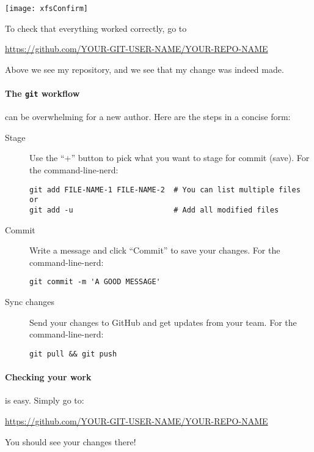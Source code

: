 \documentclass{ximera}
\begin{document}
\newpage

\begin{image}
    \texttt{[image: xfsConfirm]}
\end{image}
To check that everything worked correctly, go to
\begin{center}
    \url{https://github.com/YOUR-GIT-USER-NAME/YOUR-REPO-NAME}
\end{center}
Above we see my repository, and we see that my change was indeed made.


\paragraph{The \texttt{git} workflow} can be overwhelming for a new author. Here are the steps in a concise form:
\begin{description}
    \item[Stage] Use the ``+'' button to pick what you want to
          stage for commit (save). For the command-line-nerd:
\begin{verbatim}
git add FILE-NAME-1 FILE-NAME-2  # You can list multiple files or
git add -u                       # Add all modified files 
\end{verbatim}
    \item[Commit] Write a message and click ``Commit'' to save
          your
          changes. For the command-line-nerd:
\begin{verbatim}
git commit -m 'A GOOD MESSAGE'
\end{verbatim}
\pdfOnly{\end{description}}
\pdfOnly{\begin{minipage}{\columnwidth}}
\pdfOnly{\begin{description}}    
    \item[Sync changes] Send your changes to GitHub and get updates from
          your
          team.
          For the command-line-nerd:
\begin{verbatim}
git pull && git push
\end{verbatim}
\end{description}
\paragraph{Checking your work} is easy. Simply go to:
\begin{center}
    \url{https://github.com/YOUR-GIT-USER-NAME/YOUR-REPO-NAME}
\end{center}
You should see your changes there!
\pdfOnly{\end{minipage}}
\pdfOnly{\end{multicols}}



\twocolumn
\end{document}
